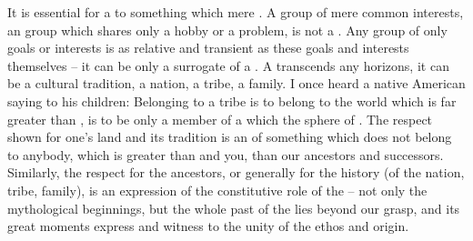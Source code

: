 It is essential for a  to  something which
 mere .  A group of mere common interests, an
 group which shares only a hobby or a problem, is not a
. Any group of only  goals or interests is as relative
and transient as these goals and interests themselves -- it can be only a
surrogate of a . A  transcends any 
horizons, it can be a cultural tradition, a nation, a tribe, a family. I once
heard a native American saying to his children:  Belonging to a tribe
is to belong to the world which is far greater than , is to be only a
member of a  which  the sphere of .  The
respect  shown for one's 
land and its tradition is an  of  something which does
not belong to anybody, which is greater than  and you, than our ancestors
and successors.  Similarly, the respect for the ancestors, or generally for the
history (of the nation, tribe, family), is an expression of the constitutive
role of the  -- not only the mythological beginnings, but the
whole past of the  lies beyond our  grasp, and its
great moments express and witness to the unity of the  ethos and
origin.


